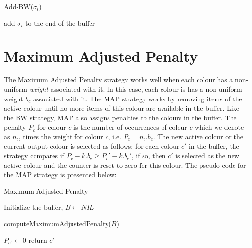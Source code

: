 \begin{function*} 
\caption{Add-BW($\sigma_i$)}
\label{addbw}
add $\sigma_i$ to the end of the buffer \;
\end{function*}

\section{Maximum Adjusted Penalty} \label{map}
The Maximum Adjusted Penalty strategy works well when each colour has a
non-uniform \textit{weight} associated with it. In this case, each colour is has
a non-uniform weight $b_c$ associated with it. The MAP strategy works by
removing items of the active colour until no more items of this colour are
available in the buffer. Like the BW strategy, MAP also assigns penalties to
the colours in the buffer. The penalty $P_c$ for colour $c$ is the number of
occurrences of colour $c$ which we denote as $n_c$, times the weight for colour
$c$, i.e. $P_c = n_c . b_c$. The new active colour or the current output colour
is selected as follows: for each colour $c'$ in the buffer, the strategy
compares if $P_c - k . b_c \geq P_c' - k . b_c'$, if so, then $c'$ is selected
as the new active colour and the counter is reset to zero for this colour. The
pseudo-code for the MAP strategy is presented below:

\begin{algorithm}
\caption{Maximum Adjusted Penalty}
\label{maximumadjustedpenalty}
Initialize the buffer, $B \gets NIL$ \;
\end{algorithm}

\begin{function*}
\caption{computeMaximumAdjustedPenalty($B$)}
\label{mapfn}

$P_{c'} \gets 0$ \;
return $c'$ \;
\end{function*}

